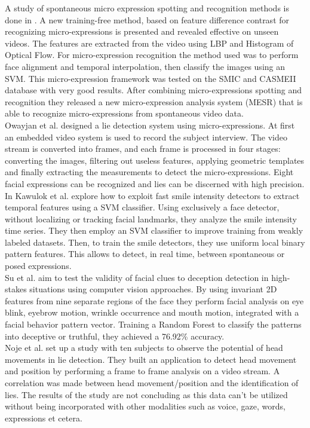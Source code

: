 A study of spontaneous micro expression spotting and recognition methods is done in \cite{xli2015reading}. A new training-free method, based on feature difference contrast for recognizing micro-expressions is presented and revealed effective on unseen videos.
The features are extracted from the video using LBP and Histogram of Optical Flow. 
For micro-expression recognition the method used was to perform face alignment and temporal interpolation, then classify the images using an SVM. 
This micro-expression framework was tested on the SMIC and CASMEII database with very good results. After combining micro-expressions spotting and recognition they released a new micro-expression analysis system (MESR) that is able to recognize micro-expressions from spontaneous video data. \\
Owayjan et al. \cite{6462897} designed a lie detection system using micro-expressions. At first an embedded video system is used to record the subject interview. The video stream is converted into frames, and each frame is processed in four stages: converting the images, filtering out useless features, applying geometric templates and finally extracting the measurements to detect the micro-expressions. Eight facial expressions can be recognized and lies can be discerned with high precision. \\
In \cite{10.1007/978-3-319-47955-2_27} Kawulok et al. explore how to exploit fast smile intensity detectors to extract temporal features using a SVM classifier. Using exclusively a face detector, without localizing or tracking facial landmarks, they analyze the smile intensity time series. They then employ an SVM classifier to improve training from weakly labeled datasets. Then, to train the smile detectors, they use uniform local binary pattern features. This allows to detect, in real time, between spontaneous or posed expressions. \\
Su et al. \cite{SU201652} aim to test the validity of facial clues to deception detection in high-stakes situations using computer vision approaches. By using invariant 2D features from nine separate regions of the face they perform facial analysis on eye blink, eyebrow motion, wrinkle occurrence and mouth motion, integrated with a facial behavior pattern vector. Training a Random Forest to classify the patterns into deceptive or truthful, they achieved a 76.92\% accuracy. \\
Noje et al. \cite{7367432} set up a study with ten subjects to observe the potential of head movements in lie detection. They built an application to detect head movement and position by performing a frame to frame analysis on a video stream. A correlation was made between head movement/position and the identification of lies. The results of the study are not concluding as this data can't be utilized without being incorporated with other modalities such as voice, gaze, words, expressions et cetera.



